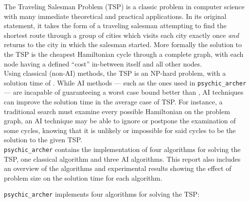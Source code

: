 \documentclass{article}
\begin{document}


The Traveling Salesman Problem (TSP) is a classic problem in computer science with many immediate theoretical and practical applications.
In its original statement, it takes the form of a traveling salesman attempting to find the shortest route through a group of cities which visits each city exactly once {\it and} returns to the city in which the salesman started.
More formally the solution to the TSP is the cheapest Hamiltonian cycle through a complete graph, with each node having a defined ``cost'' in-between itself and all other nodes. \\

Using classical (non-AI) methods, the TSP is an NP-hard problem, with a solution time of .
While AI methods --- such as the ones used in {\tt psychic\_archer} --- are incapable of guaranteeing a worst case bound better than , AI techniques can improve the solution time in the average case of TSP.
For instance, a traditional search must examine every possible Hamiltonian on the problem graph, an AI technique may be able to ignore or postpone the examination of some cycles, knowing that it is unlikely or impossible for said cycles to be the solution to the given TSP. \\

{\tt psychic\_archer} contains the implementation of four algorithms for solving the TSP, one classical algorithm and three AI algorithms.
This report also includes an overview of the algorithms and experimental results showing the effect of problem size on the solution time for each algorithm.


{\tt psychic\_archer} implements four algorithms for solving the TSP:
\end{document}
